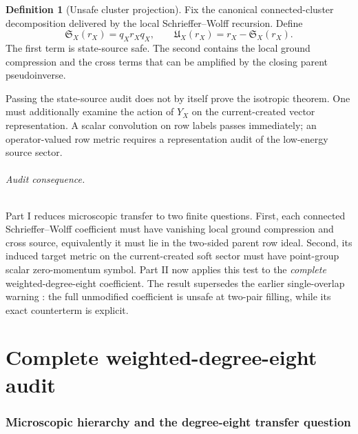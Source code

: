 \documentclass[11pt]{article}
\theoremstyle{definition}
\newtheorem{definition}[theorem]{Definition}
\theoremstyle{remark}
\begin{document}
\begin{definition}[Unsafe cluster projection]
Fix the canonical connected-cluster decomposition delivered by the local
Schrieffer--Wolff recursion.  Define
\begin{equation}
 \mathfrak S_X(r_X)=q_Xr_Xq_X,
 \qquad
 \mathfrak U_X(r_X)=r_X-\mathfrak S_X(r_X).
 \label{eq:safe-unsafe}
\end{equation}
The first term is state-source safe.  The second contains the local ground
compression and the cross terms that can be amplified by the closing parent
pseudoinverse.
\end{definition}

Passing the state-source audit does not by itself prove the isotropic theorem.
One must additionally examine the action of $Y_X$ on the current-created
vector representation.  A scalar convolution on row labels passes
immediately; an operator-valued row metric requires a representation audit of
the low-energy source sector.


\paragraph{Audit consequence.}
Part I reduces microscopic transfer to two finite questions.  First, each
connected Schrieffer--Wolff coefficient must have vanishing local ground
compression and cross source, equivalently it must lie in the two-sided parent
row ideal.  Second, its induced target metric on the current-created soft
sector must have point-group scalar zero-momentum symbol.  Part II now applies
this test to the \emph{complete} weighted-degree-eight coefficient.  The
result supersedes the earlier single-overlap warning
\cite{SledgianowskiSWTransfer}: the full unmodified coefficient is unsafe at
two-pair filling, while its exact counterterm is explicit.

\part{Complete weighted-degree-eight audit}

\section{Microscopic hierarchy and the degree-eight transfer question}\label{sec:hierarchy}
\end{document}
